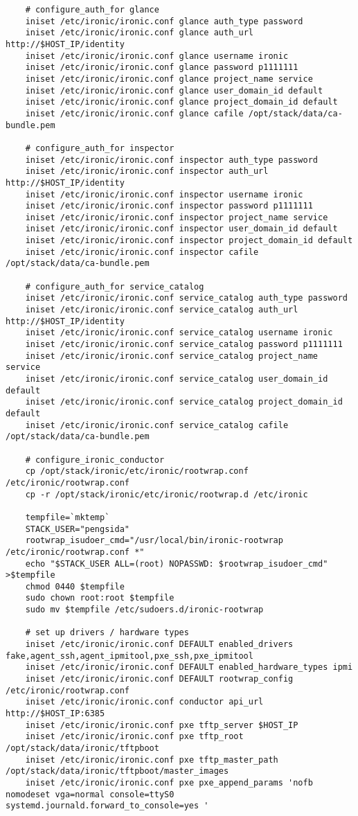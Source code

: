 \documentclass[a4paper,left=1.5cm,right=1.5cm,11pt]{article}
\begin{document}
\begin{lstlisting}
    # configure_auth_for glance
	iniset /etc/ironic/ironic.conf glance auth_type password
    iniset /etc/ironic/ironic.conf glance auth_url http://$HOST_IP/identity
    iniset /etc/ironic/ironic.conf glance username ironic
    iniset /etc/ironic/ironic.conf glance password p1111111
    iniset /etc/ironic/ironic.conf glance project_name service
    iniset /etc/ironic/ironic.conf glance user_domain_id default
    iniset /etc/ironic/ironic.conf glance project_domain_id default
    iniset /etc/ironic/ironic.conf glance cafile /opt/stack/data/ca-bundle.pem

	# configure_auth_for inspector
	iniset /etc/ironic/ironic.conf inspector auth_type password
    iniset /etc/ironic/ironic.conf inspector auth_url http://$HOST_IP/identity
    iniset /etc/ironic/ironic.conf inspector username ironic
    iniset /etc/ironic/ironic.conf inspector password p1111111
    iniset /etc/ironic/ironic.conf inspector project_name service
    iniset /etc/ironic/ironic.conf inspector user_domain_id default
    iniset /etc/ironic/ironic.conf inspector project_domain_id default
    iniset /etc/ironic/ironic.conf inspector cafile /opt/stack/data/ca-bundle.pem

	# configure_auth_for service_catalog
	iniset /etc/ironic/ironic.conf service_catalog auth_type password
    iniset /etc/ironic/ironic.conf service_catalog auth_url http://$HOST_IP/identity
    iniset /etc/ironic/ironic.conf service_catalog username ironic
    iniset /etc/ironic/ironic.conf service_catalog password p1111111
    iniset /etc/ironic/ironic.conf service_catalog project_name service
    iniset /etc/ironic/ironic.conf service_catalog user_domain_id default
    iniset /etc/ironic/ironic.conf service_catalog project_domain_id default
    iniset /etc/ironic/ironic.conf service_catalog cafile /opt/stack/data/ca-bundle.pem

	# configure_ironic_conductor
    cp /opt/stack/ironic/etc/ironic/rootwrap.conf /etc/ironic/rootwrap.conf
    cp -r /opt/stack/ironic/etc/ironic/rootwrap.d /etc/ironic

	tempfile=`mktemp`
	STACK_USER="pengsida"
	rootwrap_isudoer_cmd="/usr/local/bin/ironic-rootwrap /etc/ironic/rootwrap.conf *"
	echo "$STACK_USER ALL=(root) NOPASSWD: $rootwrap_isudoer_cmd" >$tempfile
    chmod 0440 $tempfile
    sudo chown root:root $tempfile
    sudo mv $tempfile /etc/sudoers.d/ironic-rootwrap

	# set up drivers / hardware types
    iniset /etc/ironic/ironic.conf DEFAULT enabled_drivers fake,agent_ssh,agent_ipmitool,pxe_ssh,pxe_ipmitool
    iniset /etc/ironic/ironic.conf DEFAULT enabled_hardware_types ipmi
    iniset /etc/ironic/ironic.conf DEFAULT rootwrap_config /etc/ironic/rootwrap.conf
    iniset /etc/ironic/ironic.conf conductor api_url http://$HOST_IP:6385
	iniset /etc/ironic/ironic.conf pxe tftp_server $HOST_IP
    iniset /etc/ironic/ironic.conf pxe tftp_root /opt/stack/data/ironic/tftpboot
    iniset /etc/ironic/ironic.conf pxe tftp_master_path /opt/stack/data/ironic/tftpboot/master_images
	iniset /etc/ironic/ironic.conf pxe pxe_append_params 'nofb nomodeset vga=normal console=ttyS0 systemd.journald.forward_to_console=yes '


\end{lstlisting}
\end{document}

